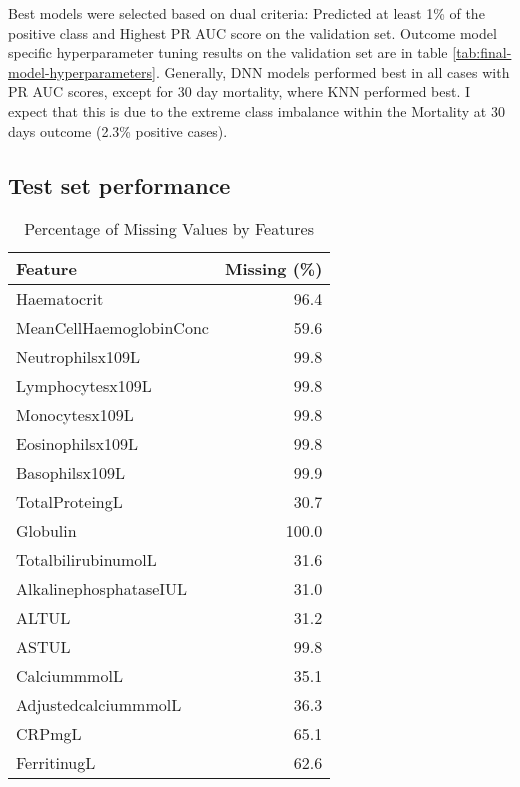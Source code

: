 \documentclass{article}
\begin{document}
 Best models were selected based on dual criteria: Predicted at least 1\% of the positive class and Highest PR AUC score on the validation set. Outcome model specific hyperparameter tuning results on the validation set are in table \ref{tab:final-model-hyperparameters}. Generally, DNN models performed best in all cases with PR AUC scores, except for 30 day mortality, where KNN performed best. I expect that this is due to the extreme class imbalance within the Mortality at 30 days outcome (2.3\% positive cases).

 \subsection{Test set performance}




 \begin{table}[H]
    \centering
    \begin{tabular}{lr}
    \toprule
    \textbf{Feature} & \textbf{Missing (\%)} \\
    \midrule
    Haematocrit & 96.4 \\
    MeanCellHaemoglobinConc & 59.6 \\
    Neutrophilsx109L & 99.8 \\
    Lymphocytesx109L & 99.8 \\
    Monocytesx109L & 99.8 \\
    Eosinophilsx109L & 99.8 \\
    Basophilsx109L & 99.9 \\
    TotalProteingL & 30.7 \\
    Globulin & 100.0 \\
    TotalbilirubinumolL & 31.6 \\
    AlkalinephosphataseIUL & 31.0 \\
    ALTUL & 31.2 \\
    ASTUL & 99.8 \\
    CalciummmolL & 35.1 \\
    AdjustedcalciummmolL & 36.3 \\
    CRPmgL & 65.1 \\
    FerritinugL & 62.6 \\
    \bottomrule
    \end{tabular}
    \caption{Percentage of Missing Values by Features}
    \label{tab:missing-values}
\end{table}
\end{document}

